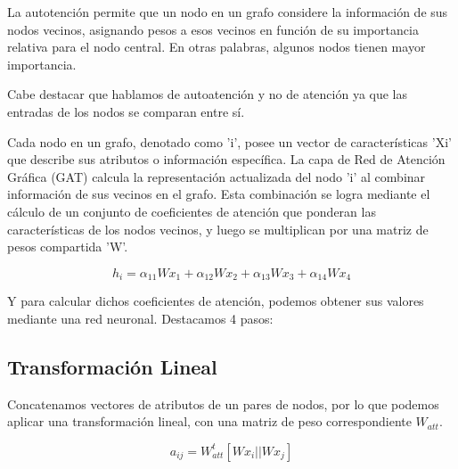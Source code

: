 \documentclass{article}
\begin{document}
\vspace{0.5cm}

La autotención permite que un nodo en un grafo considere la información de sus nodos vecinos, asignando pesos a esos vecinos en función de su importancia relativa para el nodo central. En otras palabras, algunos nodos tienen mayor importancia.

\vspace{0.5cm}

Cabe destacar que hablamos de autoatención y no de atención ya que las entradas de los nodos se comparan entre sí.

\vspace{0.5cm}

Cada nodo en un grafo, denotado como 'i', posee un vector de características 'Xi' que describe sus atributos o información específica. La capa de Red de Atención Gráfica (GAT) calcula la representación actualizada del nodo 'i' al combinar información de sus vecinos en el grafo. Esta combinación se logra mediante el cálculo de un conjunto de coeficientes de atención que ponderan las características de los nodos vecinos, y luego se multiplican por una matriz de pesos compartida 'W'.

\vspace{0.5cm}

\begin{equation}
    h_{i} = \alpha_{11}Wx_{1} + \alpha_{12}Wx_{2} + \alpha_{13}Wx_{3} + \alpha_{14}Wx_{4}
\end{equation}

\vspace{0.5cm}

Y para calcular dichos coeficientes de atención, podemos obtener sus valores mediante una red neuronal. Destacamos 4 pasos:

\vspace{1cm}

\subsection{Transformación Lineal}

\vspace{1cm}

Concatenamos vectores de atributos de un pares de nodos, por lo que podemos aplicar una transformación lineal, con una matriz de peso correspondiente $W_{att}$.

\vspace{0.5cm}

\begin{equation}
    a_{ij} = W_{att}^{t} [Wx_{i} || Wx_{j}]
\end{equation}
\end{document}
